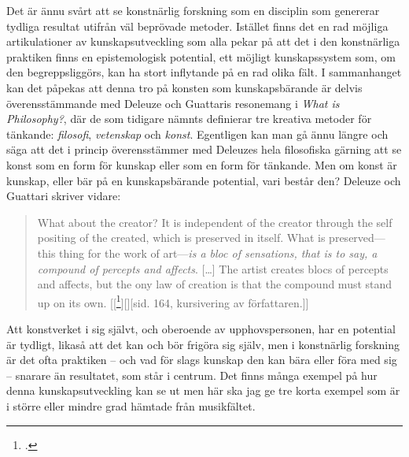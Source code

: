 \documentclass[11pt]{article}
\begin{document}
Det är ännu svårt att se konstnärlig forskning som en disciplin som
genererar tydliga resultat utifrån väl beprövade metoder. Istället
finns det en rad möjliga artikulationer av kunskapsutveckling som alla
pekar på att det i den konstnärliga praktiken finns en
epistemologisk potential, ett möjligt kunskapssystem som, om den
begreppsliggörs, kan ha stort inflytande på en rad olika fält. I
sammanhanget kan det påpekas att denna tro på konsten som
kunskapsbärande är delvis överensstämmande med Deleuze och Guattaris
resonemang i \emph{What is Philosophy?}, där de som tidigare nämnts
definierar tre kreativa metoder för tänkande: \emph{filosofi}, \emph{vetenskap} och
\emph{konst}. Egentligen kan man gå ännu längre och säga att det i
princip överensstämmer med Deleuzes hela filosofiska gärning att se
konst som en form för kunskap eller som en form för tänkande. Men om
konst är kunskap, eller bär på en kunskapsbärande potential, vari
består den? Deleuze och Guattari skriver vidare:
\begin{quote}
    What about the creator? It is independent of the creator through
    the self positing of the created, which is preserved in
    itself. What is preserved---this thing for the work of
    art---\emph{is a bloc of sensations, that is to say, a compound of
        percepts and affects}. [\ldots] The artist creates blocs of
    percepts and affects, but the ony law of creation is that the
    compound must stand up on its
    own. [[\footcite{deleuze1994}][][sid. 164, kursivering av författaren.]]
\end{quote}
Att konstverket i sig självt, och oberoende av upphovspersonen, har en
potential är tydligt, likaså att det kan och bör frigöra sig själv,
men i konstnärlig forskning är det ofta praktiken -- och vad för slags
kunskap den kan bära eller föra med sig -- snarare än resultatet, som
står i centrum. Det finns många exempel på hur denna
kunskapsutveckling kan se ut men här ska jag ge tre korta exempel som
är i större eller mindre grad hämtade från musikfältet.

\end{document}
